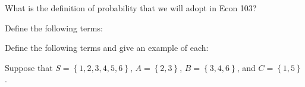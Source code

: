 \documentclass[addpoints,12pt]{exam}
\begin{document}
\begin{questions}

\question What is the definition of probability that we will adopt in Econ 103?

\question Define the following terms:


\question Define the following terms and give an example of each:

\question Suppose that $S = \left\{1, 2, 3, 4, 5, 6 \right\}$, $A = \left\{2, 3 \right\}$, $B = \left\{ 3, 4, 6 \right\}$, and $C = \left\{ 1, 5 \right\}$.
\end{questions}
\end{document}
